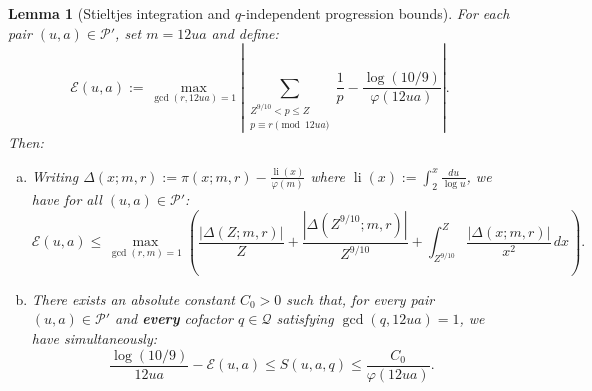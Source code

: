 \documentclass[11pt, a4paper]{article}
\theoremstyle{plain}
\newtheorem{lemma}[theorem]{Lemma}
\theoremstyle{definition}
\begin{document}
\begin{lemma}[Stieltjes integration and $q$-independent progression bounds]\label{lem:encadrement_A_Stieltjes}
For each pair $(u,a) \in \mathcal{P}'$, set $m = 12ua$ and define:
\begin{equation}\label{eq:def_erreur_E_ua}
\mathcal{E}(u,a) := \max_{\gcd(r, 12ua)=1} \left| \sum_{\substack{Z^{9/10} < p \le Z \\ p \equiv r \pmod{12ua}}} \frac{1}{p} - \frac{\log(10/9)}{\varphi(12ua)} \right|.
\end{equation}
Then:
\begin{enumerate}[(a)]
    \item Writing $\Delta(x; m, r) := \pi(x; m, r) - \frac{\operatorname{li}(x)}{\varphi(m)}$ where $\operatorname{li}(x) := \int_2^x \frac{du}{\log u}$, we have for all $(u,a) \in \mathcal{P}'$:
    \begin{equation}\label{eq:Stieltjes_exact_E_ua}
    \mathcal{E}(u,a) \le \max_{\gcd(r,m)=1} \left( \frac{|\Delta(Z; m, r)|}{Z} + \frac{|\Delta(Z^{9/10}; m, r)|}{Z^{9/10}} + \int_{Z^{9/10}}^Z \frac{|\Delta(x; m, r)|}{x^2}\,dx \right).
    \end{equation}
    \item There exists an absolute constant $C_0 > 0$ such that, for every pair $(u,a) \in \mathcal{P}'$ and \textbf{every} cofactor $q \in \mathcal{Q}$ satisfying $\gcd(q, 12ua) = 1$, we have simultaneously:
    \begin{equation}\label{eq:encadrement_A_sec}
    \frac{\log(10/9)}{12ua} - \mathcal{E}(u,a) \le S(u,a,q) \le \frac{C_0}{\varphi(12ua)}. \tag{A}
    \end{equation}
\end{enumerate}
\end{lemma}
\end{document}

